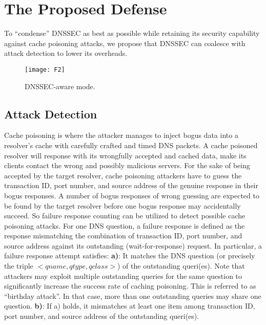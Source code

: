 \documentclass[conference]{IEEEtran}
\begin{document}
\section{The Proposed Defense}

To ``condense'' DNSSEC as best as possible while retaining its security capability against cache poisoning attacks, we propose that DNSSEC can coalesce with attack detection to lower its overheads.

\begin{figure}[!t]
\centering
\texttt{[image: F2]}
\caption{DNSSEC-aware mode.}
\vspace{-2em}
\end{figure}

\subsection{Attack Detection}

Cache poisoning is where the attacker manages to inject bogus data into a resolver's cache with carefully crafted and timed DNS packets. A cache poisoned resolver will response with its wrongfully accepted and cached data, make its clients contact the wrong and possibly malicious servers. For the sake of being accepted by the target resolver, cache poisoning attackers have to guess the transaction ID, port number, and source address of the genuine response in their bogus responses. A number of bogus responses of wrong guessing are expected to be found by the target resolver before one bogus response may accidentally succeed. So failure response counting can be utilized to detect possible cache poisoning attacks. For one DNS question, a failure response is defined as the response mismatching the combination of transaction ID, port number, and source address against its outstanding (wait-for-response) request. In particular, a failure response attempt satisfies: \textbf{a)}: It matches the DNS question (or precisely the triple $<qname,qtype,qclass>$) of the outstanding queri(es). Note that attackers may exploit multiple outstanding queries for the same question to significantly increase the success rate of caching poisoning. This is referred to as ``birthday attack''. In that case, more than one outstanding queries may share one question. \textbf{b)}: If a) holds, it mismatches at least one item among transaction ID, port number, and source address of the outstanding queri(es).
\end{document}
